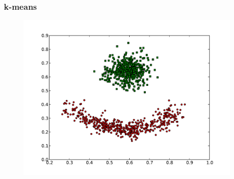 \documentclass{beamer}
\begin{document}




\begin{frame}
\frametitle{k-means}
    \begin{figure}[]
    \includegraphics[scale=0.5]{kmeans_red-blue-clusters.pdf}
    \end{figure}
\end{frame}
\end{document}
